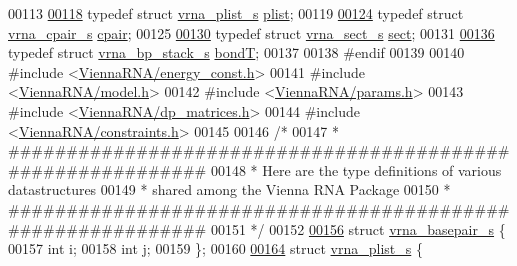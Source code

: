 \begin{DoxyCode}
00113 
\hypertarget{data__structures_8h_source_l00118}{}\hyperlink{group__data__structures_gab1d8894b43aa84cbc50b862a73785fbc}{00118} \textcolor{keyword}{typedef} \textcolor{keyword}{struct }\hyperlink{group__data__structures_structvrna__plist__s}{vrna\_plist\_s}     \hyperlink{group__data__structures_structvrna__plist__s}{plist};
00119 
\hypertarget{data__structures_8h_source_l00124}{}\hyperlink{group__data__structures_ga8412f116a2eb07b59ade9e14ca7c5ef1}{00124} \textcolor{keyword}{typedef} \textcolor{keyword}{struct }\hyperlink{group__data__structures_structvrna__cpair__s}{vrna\_cpair\_s}     \hyperlink{group__data__structures_structvrna__cpair__s}{cpair};
00125 
\hypertarget{data__structures_8h_source_l00130}{}\hyperlink{group__data__structures_gaaacedee1f05d3d45aa6764eca51a8876}{00130} \textcolor{keyword}{typedef} \textcolor{keyword}{struct }\hyperlink{group__data__structures_structvrna__sect__s}{vrna\_sect\_s}      \hyperlink{group__data__structures_structvrna__sect__s}{sect};
00131 
\hypertarget{data__structures_8h_source_l00136}{}\hyperlink{group__data__structures_gaaeed53a7508c6ce549a98223e94b25df}{00136} \textcolor{keyword}{typedef} \textcolor{keyword}{struct }\hyperlink{group__data__structures_structvrna__bp__stack__s}{vrna\_bp\_stack\_s}  \hyperlink{group__data__structures_structvrna__bp__stack__s}{bondT};
00137 
00138 \textcolor{preprocessor}{#endif}
00139 
00140 \textcolor{preprocessor}{#include <\hyperlink{energy__const_8h}{ViennaRNA/energy\_const.h}>}
00141 \textcolor{preprocessor}{#include <\hyperlink{model_8h}{ViennaRNA/model.h}>}
00142 \textcolor{preprocessor}{#include <\hyperlink{params_8h}{ViennaRNA/params.h}>}
00143 \textcolor{preprocessor}{#include <\hyperlink{dp__matrices_8h}{ViennaRNA/dp\_matrices.h}>}
00144 \textcolor{preprocessor}{#include <\hyperlink{constraints_8h}{ViennaRNA/constraints.h}>}
00145 
00146 \textcolor{comment}{/*}
00147 \textcolor{comment}{* ############################################################}
00148 \textcolor{comment}{* Here are the type definitions of various datastructures}
00149 \textcolor{comment}{* shared among the Vienna RNA Package}
00150 \textcolor{comment}{* ############################################################}
00151 \textcolor{comment}{*/}
00152 
\hypertarget{data__structures_8h_source_l00156}{}\hyperlink{group__data__structures}{00156} \textcolor{keyword}{struct }\hyperlink{group__data__structures_structvrna__basepair__s}{vrna\_basepair\_s} \{
00157   \textcolor{keywordtype}{int} i;
00158   \textcolor{keywordtype}{int} j;
00159 \};
00160 
\hypertarget{data__structures_8h_source_l00164}{}\hyperlink{group__data__structures}{00164} \textcolor{keyword}{struct }\hyperlink{group__data__structures_structvrna__plist__s}{vrna\_plist\_s} \{

\end{DoxyCode}

